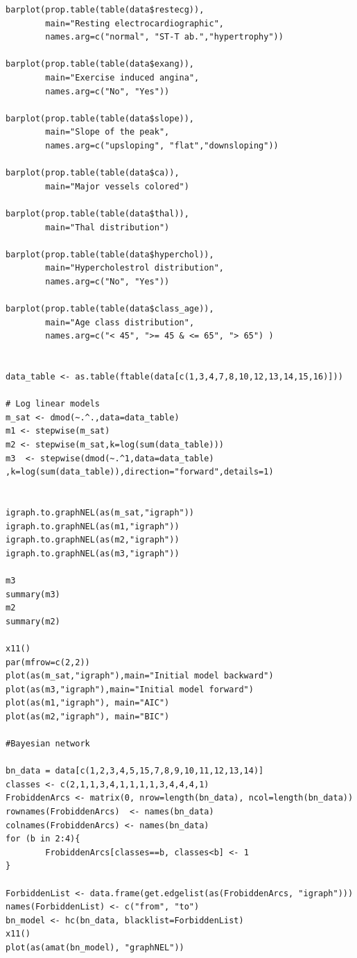 \documentclass{article}
\begin{document}
\begin{verbatim}
barplot(prop.table(table(data$restecg)), 
        main="Resting electrocardiographic",  
        names.arg=c("normal", "ST-T ab.","hypertrophy"))
        
barplot(prop.table(table(data$exang)), 
        main="Exercise induced angina",  
        names.arg=c("No", "Yes"))
        
barplot(prop.table(table(data$slope)),
        main="Slope of the peak",  
        names.arg=c("upsloping", "flat","downsloping"))
        
barplot(prop.table(table(data$ca)), 
        main="Major vessels colored")
        
barplot(prop.table(table(data$thal)), 
        main="Thal distribution")
        
barplot(prop.table(table(data$hyperchol)), 
        main="Hypercholestrol distribution",  
        names.arg=c("No", "Yes"))
        
barplot(prop.table(table(data$class_age)),
        main="Age class distribution", 
        names.arg=c("< 45", ">= 45 & <= 65", "> 65") )


data_table <- as.table(ftable(data[c(1,3,4,7,8,10,12,13,14,15,16)]))

# Log linear models
m_sat <- dmod(~.^.,data=data_table) 
m1 <- stepwise(m_sat)
m2 <- stepwise(m_sat,k=log(sum(data_table)))
m3  <- stepwise(dmod(~.^1,data=data_table) ,k=log(sum(data_table)),direction="forward",details=1)


igraph.to.graphNEL(as(m_sat,"igraph"))
igraph.to.graphNEL(as(m1,"igraph"))
igraph.to.graphNEL(as(m2,"igraph"))
igraph.to.graphNEL(as(m3,"igraph"))

m3
summary(m3)
m2
summary(m2)

x11()
par(mfrow=c(2,2))
plot(as(m_sat,"igraph"),main="Initial model backward")
plot(as(m3,"igraph"),main="Initial model forward")
plot(as(m1,"igraph"), main="AIC")
plot(as(m2,"igraph"), main="BIC")

#Bayesian network

bn_data = data[c(1,2,3,4,5,15,7,8,9,10,11,12,13,14)]
classes <- c(2,1,1,3,4,1,1,1,1,3,4,4,4,1)
FrobiddenArcs <- matrix(0, nrow=length(bn_data), ncol=length(bn_data)) 
rownames(FrobiddenArcs)  <- names(bn_data) 
colnames(FrobiddenArcs) <- names(bn_data)
for (b in 2:4){
        FrobiddenArcs[classes==b, classes<b] <- 1 
}

ForbiddenList <- data.frame(get.edgelist(as(FrobiddenArcs, "igraph")))
names(ForbiddenList) <- c("from", "to") 
bn_model <- hc(bn_data, blacklist=ForbiddenList)
x11()
plot(as(amat(bn_model), "graphNEL"))


\end{verbatim}
\end{document}
